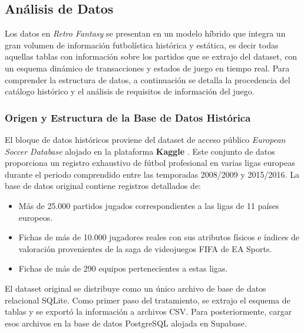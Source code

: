 \subsection{Análisis de Datos}
Los datos en \textit{Retro Fantasy} se presentan en un modelo híbrido que integra un gran volumen de información futbolística histórica y estática, es decir todas aquellas tablas con información sobre los partidos que se extrajo del dataset, con un esquema dinámico de transacciones y estados de juego en tiempo real. Para comprender la estructura de datos, a continuación se detalla la procedencia del catálogo histórico y el análisis de requisitos de información del juego.

\subsubsection{Origen y Estructura de la Base de Datos Histórica}
El bloque de datos históricos proviene del dataset de acceso público \textit{European Soccer Database} alojado en la plataforma \textbf{Kaggle} \cite{kaggle_dataset}. Este conjunto de datos proporciona un registro exhaustivo de fútbol profesional en varias ligas europeas durante el periodo comprendido entre las temporadas 2008/2009 y 2015/2016. La base de datos original contiene registros detallados de:
\begin{itemize}
    \item Más de 25.000 partidos jugados correspondientes a las ligas de 11 países europeos.
    \item Fichas de más de 10.000 jugadores reales con sus atributos físicos e índices de valoración provenientes de la saga de videojuegos FIFA de EA Sports.
    \item Fichas de más de 290 equipos pertenecientes a estas ligas.
\end{itemize}

El dataset original se distribuye como un único archivo de base de datos relacional SQLite. Como primer paso del tratamiento, se extrajo el esquema de tablas y se exportó la información a archivos CSV. Para posteriormente, cargar esos archivos en la base de datos PostgreSQL alojada en Supabase.

